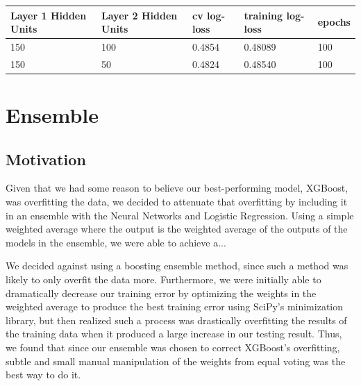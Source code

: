 \documentclass[twoside,11pt]{article}
\theoremstyle{definition}
\begin{document}
      \begin{center}
          \begin{tabular}{ | l | l | l | l | p{5cm} |}
          \hline
          Layer 1 Hidden Units & Layer 2 Hidden Units & cv log-loss & training log-loss & epochs \\ \hline
          150 & 100 & 0.4854 & 0.48089 & 100 \\ \hline
          150 & 50 & 0.4824 & 0.48540 & 100 \\ \hline
          \end{tabular}
      \end{center}

\section{Ensemble}
  \subsection{Motivation}
  Given that we had some reason to believe our best-performing model, XGBoost, was overfitting the data, we decided to attenuate that overfitting by including it in an ensemble with the Neural Networks and Logistic Regression. Using a simple weighted average where the output is the weighted average of the outputs of the models in the ensemble, we were able to achieve a...

  We decided against using a boosting ensemble method, since such a method was likely to only overfit the data more. Furthermore, we were initially able to dramatically decrease our training error by optimizing the weights in the weighted average to produce the best training error using SciPy's minimization library, but then realized such a process was drastically overfitting the results of the training data when it produced a large increase in our testing result. Thus, we found that since our ensemble was chosen to correct XGBoost's overfitting, subtle and small manual manipulation of the weights from equal voting was the best way to do it.
\end{document}
